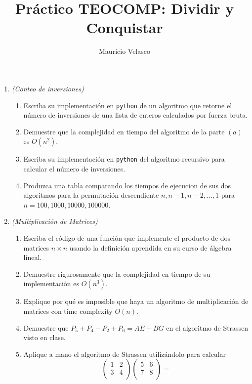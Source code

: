 \documentclass[12pt, a4paper]{article}
\date{}
\begin{document}
\title{Pr\'actico TEOCOMP: Dividir y Conquistar}
\author{Mauricio Velasco}
\maketitle
\begin{enumerate}
\item \emph{(Conteo de inversiones)}
\begin{enumerate}
\item Escriba su implementación en \verb!python! de un algoritmo que retorne el número de inversiones de una lista de enteros calculados por fuerza bruta.
\item Demuestre que la complejidad en tiempo del algoritmo de la parte $(a)$ es $O(n^2)$.
\item Escriba su implementación en \verb!python! del algoritmo recursivo para calcular el número de inversiones.
\item Produzca una tabla comparando los tiempos de ejecucion de sus dos algoritmos para la permutación descendiente $n,n-1,n-2,\dots,1$ para $n=100,1000,10000,100000$.
\end{enumerate}

\item \emph{(Multiplicación de Matrices)}
\begin{enumerate}
\item Escriba el código de una función que implemente el producto de dos matrices $n\times n$ usando la definición aprendida en su curso de álgebra lineal.
\item Demuestre rigurosamente que la complejidad en tiempo de su implementación es $O(n^3)$.
\item Explique por qué es imposible que haya un algoritmo de multiplicación de matrices con time complexity $O(n)$.
\item Demuestre que $P_5+P_4-P_2+P_6 = AE+BG$ en el algoritmo de Strassen visto en clase.
\item Aplique a mano el algoritmo de Strassen utilizándolo para calcular
\[
\left(\begin{array}{cc}
1 & 2 \\
3 & 4 \\
\end{array}\right)
\left(\begin{array}{cc}
5 & 6 \\
7 & 8 \\
\end{array}\right)
=
\]
\end{enumerate}


\end{enumerate}
\end{document}
